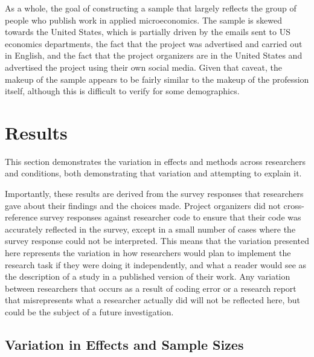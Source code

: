 \documentclass[
  letterpaper,
  DIV=11,
  numbers=noendperiod]{scrartcl}
\begin{document}
As a whole, the goal of constructing a sample that largely reflects the
group of people who publish work in applied microeconomics. The sample
is skewed towards the United States, which is partially driven by the
emails sent to US economics departments, the fact that the project was
advertised and carried out in English, and the fact that the project
organizers are in the United States and advertised the project using
their own social media. Given that caveat, the makeup of the sample
appears to be fairly similar to the makeup of the profession itself,
although this is difficult to verify for some demographics.

\hypertarget{results}{%
\section{Results}\label{results}}

This section demonstrates the variation in effects and methods across
researchers and conditions, both demonstrating that variation and
attempting to explain it.

Importantly, these results are derived from the survey responses that
researchers gave about their findings and the choices made. Project
organizers did not cross-reference survey responses against researcher
code to ensure that their code was accurately reflected in the survey,
except in a small number of cases where the survey response could not be
interpreted. This means that the variation presented here represents the
variation in how researchers would plan to implement the research task
if they were doing it independently, and what a reader would see as the
description of a study in a published version of their work. Any
variation between researchers that occurs as a result of coding error or
a research report that misrepresents what a researcher actually did will
not be reflected here, but could be the subject of a future
investigation.

\hypertarget{sec-variation}{%
\subsection{Variation in Effects and Sample Sizes}\label{sec-variation}}
\end{document}
